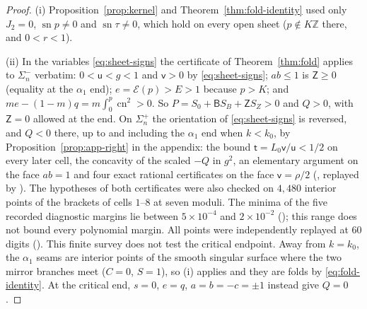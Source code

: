\documentclass[11pt]{article}
\theoremstyle{remark}
\newcommand{\sn}{\operatorname{sn}}
\newcommand{\cn}{\operatorname{cn}}
\newcommand{\epsi}{\mathcal{E}}
\begin{document}
\begin{proof}
(i) Proposition~\ref{prop:kernel} and Theorem~\ref{thm:fold-identity} used
only $J_2=0$, $\sn p\ne0$ and $\sn\tau\ne0$, which hold on every open
sheet ($p\notin K\mathbb Z$ there, and $0<r<1$).

(ii) In the variables \eqref{eq:sheet-signs} the certificate of
Theorem~\ref{thm:fold} applies to $\Sigma_n^-$ verbatim: $0<\mathsf u<g<1$
and $\mathsf v>0$ by \eqref{eq:sheet-signs}; $ab\le1$ is $\mathsf Z\ge0$
(equality at the $\alpha_1$ end); $e=\epsi(p)>E>1$ because $p>K$; and
$me-(1-m)q=m\int_0^p\cn^2>0$.  So $P=S_0+\mathsf B S_B+\mathsf Z S_Z>0$ and
$Q>0$, with $\mathsf Z=0$ allowed at the end.  On $\Sigma_n^+$ the
orientation of \eqref{eq:sheet-signs} is reversed, and $Q<0$ there, up to
and including the $\alpha_1$ end when $k<k_0$, by Proposition~\ref{prop:app-right} in
the appendix: the bound $\mathsf t=L_0\mathsf v/\mathsf u<1/2$ on every
later cell, the concavity of the scaled $-Q$ in $g^2$, an elementary
argument on the face $ab=1$ and four exact rational certificates on the
face $\mathsf v=\rho/2$ (,
replayed by ).  The hypotheses of both
certificates were also checked on $4{,}480$ interior points of the brackets
of cells $1$--$8$ at seven moduli.  The minima of the five recorded
diagnostic margins lie between $5\times10^{-4}$ and $2\times10^{-2}$
(); this range does not
bound every polynomial margin.  All points were independently replayed
at $60$ digits ().
This finite survey does not test the critical endpoint.  Away from
$k=k_0$, the $\alpha_1$ seams are interior points of the smooth singular
surface where the two mirror branches meet ($C=0$, $S=1$), so (i) applies
and they are folds by \eqref{eq:fold-identity}.  At the critical end,
$s=0$, $e=q$, $a=b=-c=\pm1$ instead give $Q=0$.


\end{proof}
\end{document}
